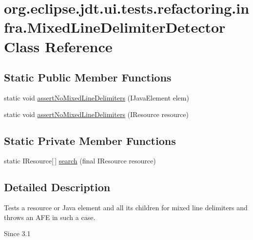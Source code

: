\hypertarget{classorg_1_1eclipse_1_1jdt_1_1ui_1_1tests_1_1refactoring_1_1infra_1_1MixedLineDelimiterDetector}{
\section{org.eclipse.jdt.ui.tests.refactoring.infra.MixedLineDelimiterDetector Class Reference}
\label{classorg_1_1eclipse_1_1jdt_1_1ui_1_1tests_1_1refactoring_1_1infra_1_1MixedLineDelimiterDetector}
}
\subsection*{Static Public Member Functions}
\begin{DoxyCompactItemize}
\item 
static void \hyperlink{classorg_1_1eclipse_1_1jdt_1_1ui_1_1tests_1_1refactoring_1_1infra_1_1MixedLineDelimiterDetector_ac45a53cb1e86a3786308742265715c03}{assertNoMixedLineDelimiters} (IJavaElement elem)
\item 
static void \hyperlink{classorg_1_1eclipse_1_1jdt_1_1ui_1_1tests_1_1refactoring_1_1infra_1_1MixedLineDelimiterDetector_a30628444d1a471f28a66a097f9f209df}{assertNoMixedLineDelimiters} (IResource resource)
\end{DoxyCompactItemize}
\subsection*{Static Private Member Functions}
\begin{DoxyCompactItemize}
\item 
static IResource\mbox{[}$\,$\mbox{]} \hyperlink{classorg_1_1eclipse_1_1jdt_1_1ui_1_1tests_1_1refactoring_1_1infra_1_1MixedLineDelimiterDetector_a4278c73510c5cb331d2d4a44bd52fcad}{search} (final IResource resource)
\end{DoxyCompactItemize}


\subsection{Detailed Description}
Tests a resource or Java element and all its children for mixed line delimiters and throws an AFE in such a case.

\begin{DoxySince}{Since}
3.1 
\end{DoxySince}



